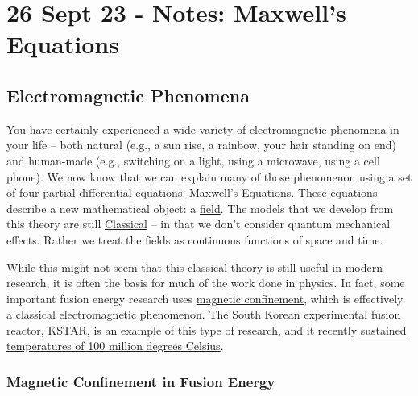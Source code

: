 \section{26 Sept 23 - Notes: Maxwell's
Equations}\label{sept-23---notes-maxwells-equations}

\subsection{Electromagnetic Phenomena}\label{electromagnetic-phenomena}

You have certainly experienced a wide variety of electromagnetic
phenomena in your life -- both natural (e.g., a sun rise, a rainbow,
your hair standing on end) and human-made (e.g., switching on a light,
using a microwave, using a cell phone). We now know that we can explain
many of those phenomenon using a set of four partial differential
equations:
\href{https://en.wikipedia.org/wiki/Maxwell\%27s_equations}{Maxwell's
Equations}. These equations describe a new mathematical object: a
\href{https://en.wikipedia.org/wiki/Field_(physics)}{field}. The models
that we develop from this theory are still
\href{https://en.wikipedia.org/wiki/Classical_physics}{Classical} -- in
that we don't consider quantum mechanical effects. Rather we treat the
fields as continuous functions of space and time.

While this might not seem that this classical theory is still useful in
modern research, it is often the basis for much of the work done in
physics. In fact, some important fusion energy research uses
\href{https://en.wikipedia.org/wiki/Magnetic_confinement_fusion}{magnetic
confinement}, which is effectively a classical electromagnetic
phenomenon. The South Korean experimental fusion reactor,
\href{https://en.wikipedia.org/wiki/KSTAR}{KSTAR}, is an example of this
type of research, and it recently
\href{https://www.popularmechanics.com/science/energy/a41191247/koreas-fusion-reactor-sustained-temperatures-7-times-hotter-than-the-sun-for-30-seconds/}{sustained
temperatures of 100 million degrees Celsius}.

\subsubsection{Magnetic Confinement in Fusion
Energy}\label{magnetic-confinement-in-fusion-energy}

\href{https://inv.tux.pizza/watch?v=PWCqwZoE0FY}{\pandocbounded{\texttt{[image: https://markdown-videos-api.jorgenkh.no/youtube/PWCqwZoE0FY?width=720\&height=405]}}}

